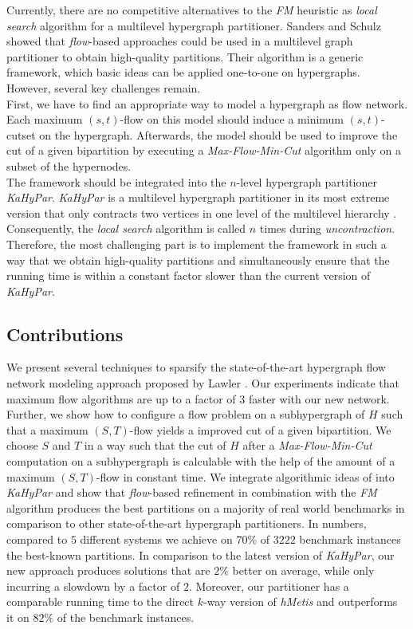 Currently, there are no competitive alternatives to the \emph{FM} heuristic as \emph{local search}
algorithm for a multilevel hypergraph partitioner. Sanders and Schulz \cite{sanders2011engineering}
showed that \emph{flow}-based approaches could be used in a multilevel graph partitioner to obtain
high-quality partitions. Their algorithm is a generic framework, which basic ideas can be
applied one-to-one on hypergraphs. However, several key challenges remain.\\
First, we have to find an appropriate way to model a hypergraph as flow network. Each maximum
$(s,t)$-flow on this model should induce a minimum $(s,t)$-cutset on the hypergraph.
Afterwards, the model should be used to improve the cut of a given bipartition by
executing a \emph{Max-Flow-Min-Cut} algorithm only on a subset of the hypernodes. \\
The framework should be integrated into the $n$-level hypergraph partitioner 
\emph{KaHyPar}. \emph{KaHyPar} is a multilevel hypergraph partitioner in its most extreme 
version that only contracts two vertices in one level of the multilevel hierarchy
\cite{akhremtsev2017engineering,heuer2017improving,schlag2016k}. Consequently, the 
\emph{local search} algorithm is called $n$ times during \emph{uncontraction}.
Therefore, the most challenging part is to implement the framework in such a way that we obtain
high-quality partitions and simultaneously ensure that the running time is within
a constant factor slower than the current version of \emph{KaHyPar}.

\subsection{Contributions}

We present several techniques to sparsify the state-of-the-art hypergraph flow network
modeling approach proposed by Lawler \cite{lawler1973}. Our experiments indicate that
maximum flow algorithms are up to a factor of $3$ faster with our new network. Further, 
we show how to configure a flow problem on a subhypergraph of $H$ such that a 
maximum $(S,T)$-flow yields a improved cut of a given bipartition. We choose $S$ and
$T$ in a way such that the cut of $H$ after a \emph{Max-Flow-Min-Cut} computation on a subhypergraph 
is calculable with the help of the amount of a maximum $(S,T)$-flow in constant time.
We integrate algorithmic ideas of \cite{sanders2011engineering} into 
\emph{KaHyPar} and show that \emph{flow}-based refinement in combination with the
\emph{FM} algorithm produces the best partitions on a majority of real world benchmarks
in comparison to other state-of-the-art hypergraph partitioners. 
In numbers, compared to $5$ different systems we achieve on $70\%$ 
of $3222$ benchmark instances the best-known partitions. In comparison to the 
latest version of \emph{KaHyPar}, our new approach produces solutions that are
$2\%$ better on average, while only incurring a slowdown by a factor of $2$.
Moreover, our partitioner has a comparable running time to the direct $k$-way
version of \emph{hMetis} and outperforms it on $82\%$ of the benchmark instances.

